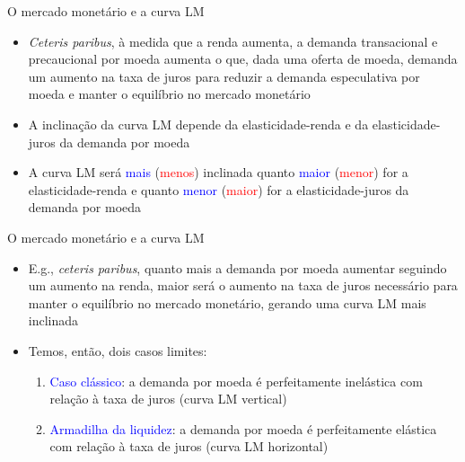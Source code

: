 \documentclass[10pt]{beamer}
\begin{document}
\begin{frame}{O mercado monetário e a curva LM}
    \begin{itemize}
        \item \emph{Ceteris paribus}, à medida que a renda aumenta, a demanda transacional e precaucional por moeda aumenta o que, dada uma oferta de moeda, demanda um aumento na taxa de juros para reduzir a demanda especulativa por moeda e manter o equilíbrio no mercado monetário
        \bigskip
        \item A inclinação da curva LM depende da elasticidade-renda e da elasticidade-juros da demanda por moeda
        \bigskip
        \item A curva LM será \textcolor{blue}{mais} (\textcolor{red}{menos}) inclinada quanto \textcolor{blue}{maior} (\textcolor{red}{menor}) for a elasticidade-renda e quanto \textcolor{blue}{menor} (\textcolor{red}{maior}) for a elasticidade-juros da demanda por moeda
    \end{itemize}
\end{frame}

\begin{frame}{O mercado monetário e a curva LM}
    \begin{itemize}
        \item E.g., \emph{ceteris paribus}, quanto mais a demanda por moeda aumentar seguindo um aumento na renda, maior será o aumento na taxa de juros necessário para manter o equilíbrio no mercado monetário, gerando uma curva LM mais inclinada
        \bigskip
        \item Temos, então, dois casos limites:
        \bigskip
        \begin{enumerate}
            \item \textcolor{blue}{Caso clássico}: a demanda por moeda é perfeitamente inelástica com relação à taxa de juros (curva LM vertical)
            \medskip
            \item \textcolor{blue}{Armadilha da liquidez}: a demanda por moeda é perfeitamente elástica com relação à taxa de juros (curva LM horizontal)
        \end{enumerate}
    \end{itemize}
\end{frame}
\end{document}
